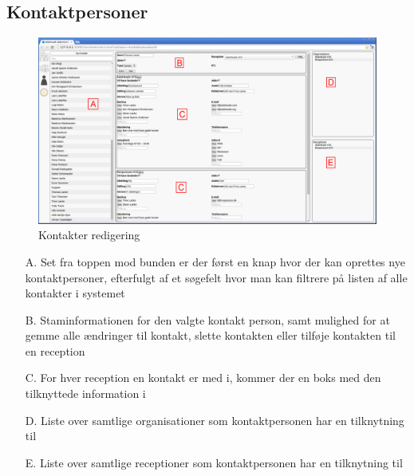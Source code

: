 

\pagebreak
\subsection{Kontaktpersoner}
\begin{figure}[ht!]
\centering
\includegraphics[width=\textwidth]{images/screen_con.png}
\caption{Kontakter redigering}
\label{fig:screencon}
\end{figure}
\begin{enumerate}
	\item[A.] {Set fra toppen mod bunden er der først en knap hvor der kan oprettes nye kontaktpersoner, efterfulgt af et søgefelt hvor man kan filtrere på listen af alle kontakter i systemet}
	\item[B.] {Staminformationen for den valgte kontakt person, samt mulighed for at gemme alle ændringer til kontakt, slette kontakten eller tilføje kontakten til en reception}
	\item[C.] {For hver reception en kontakt er med i, kommer der en boks med den tilknyttede information i}
	\item[D.] {Liste over samtlige organisationer som kontaktpersonen har en tilknytning til}
	\item[E.] {Liste over samtlige receptioner som kontaktpersonen har en tilknytning til}
\end{enumerate}

